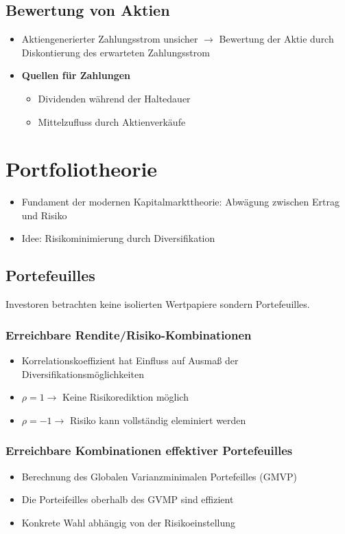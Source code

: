 \subsection{Bewertung von Aktien}
\begin{itemize}
	\item Aktiengenerierter Zahlungsstrom unsicher $\rightarrow$ Bewertung der Aktie durch Diskontierung des erwarteten Zahlungsstrom
	\item \textbf{Quellen für Zahlungen}
	\begin{itemize}
		\item Dividenden während der Haltedauer
		\item Mittelzufluss durch Aktienverkäufe
	\end{itemize}
\end{itemize}



\section{Portfoliotheorie}
\begin{itemize}
	\item Fundament der modernen Kapitalmarkttheorie: Abwägung zwischen Ertrag und Risiko
	\item Idee: Risikominimierung durch Diversifikation
\end{itemize}


\subsection{Portefeuilles}
Investoren betrachten keine isolierten Wertpapiere sondern Portefeuilles.

\subsubsection{Erreichbare Rendite/Risiko-Kombinationen}
\begin{itemize}
	\item Korrelationskoeffizient hat Einfluss auf Ausmaß der Diversifikationsmöglichkeiten
	\item \(\rho=1 \rightarrow\) Keine Risikorediktion möglich
	\item \(\rho=-1 \rightarrow\) Risiko kann vollständig eleminiert werden
\end{itemize}

\subsubsection{Erreichbare Kombinationen effektiver Portefeuilles}
\begin{itemize}
	\item Berechnung des Globalen Varianzminimalen Portefeilles (GMVP)
	\item Die Porteifeilles oberhalb des GVMP sind effizient
	\item Konkrete Wahl abhängig von der Risikoeinstellung
\end{itemize}

